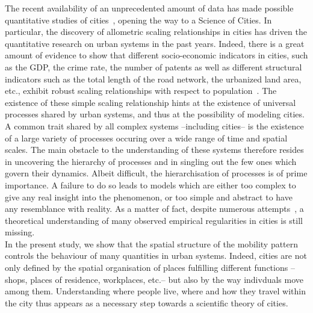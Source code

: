 The recent availability of an unprecedented amount of data has made possible quantitative studies of cities~\cite{Fujita:1999,Batty:2007,Marshall:2004}, opening the way to a Science of Cities. In particular, the discovery of allometric scaling relationships in cities has driven the quantitative research on urban systems in the past years. Indeed, there is a great amount of evidence to show that different socio-economic indicators in cities, such as the GDP, the crime rate, the number of patents as well as different structural indicators such as the total length of the road network, the urbanized land area, etc., exhibit robust scaling relationships with respect to population~\cite{Newman:1989,Makse:1995,Pumain:2006,Bettencourt:2007,Samaniego:2008,Rozenfeld:2008,Pan:2013}. The existence of these simple scaling relationship hints at the existence of universal processes shared by urban systems, and thus at the possibility of modeling cities.\\

A common trait shared by all complex systems --including cities-- is the existence of a large variety of processes occuring over a wide range of time and spatial scales. The main obstacle to the understanding of these systems therefore resides in uncovering the hierarchy of processes and in singling out the few ones which govern their dynamics. Albeit difficult, the hierarchisation of processes is of prime importance. A failure to do so leads to models which are  either too complex to give any real insight into the phenomenon, or too simple and abstract to have any resemblance with reality. As a matter of fact, despite numerous attempts~\cite{Fujita:1982,Makse:1995,Batty:2008,Frasco:2013,Bettencourt:2010,Bettencourt:2013}, a theoretical understanding of many observed empirical regularities in cities is still missing.\\

In the present study, we show that the spatial structure of the mobility pattern controls the behaviour of many quantities in urban systems. Indeed, cities are not only defined by the spatial organisation of places fulfilling different functions --shops, places of residence, workplaces, etc.-- but also by the way indivduals move among them. Understanding where people live, where and how they travel within the city thus appears as a necessary step towards a scientific theory of cities.\\ 

